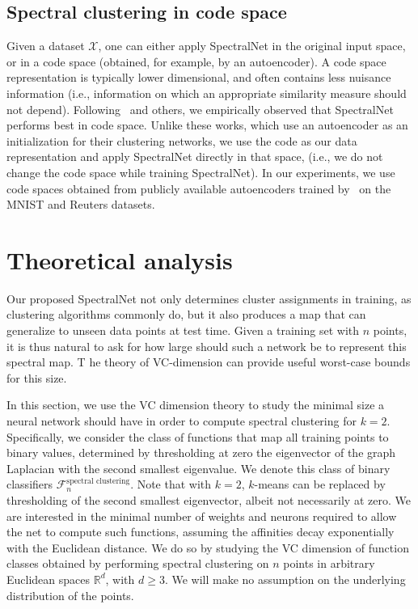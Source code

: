 \documentclass{article} %
\begin{document}
\subsection{Spectral clustering in code space}
Given a dataset $\mathcal{X}$, one can either apply SpectralNet in the original input space, or in a code space (obtained, for example, by an autoencoder). A code space representation is typically lower dimensional, and often contains less nuisance information (i.e., information on which an appropriate similarity measure should not depend).
Following~\citep{ yang2016towards, xie2016unsupervised, zheng2016variational} and others, we empirically observed that SpectralNet performs best in code space. Unlike these works, which use an autoencoder as an initialization for their clustering networks,  we use the code as our data representation and apply SpectralNet directly in that space, (i.e., we do not change the code space while training SpectralNet).
In our experiments, we use code spaces obtained from publicly available autoencoders trained by~\citet{zheng2016variational} on the MNIST and Reuters datasets.



\section {Theoretical analysis}\label{sec:analysis}
Our proposed SpectralNet not only determines cluster assignments in training, as clustering algorithms commonly do, but it also produces a map that can generalize to unseen data points at test time.
Given a training set with $n$ points, it is thus natural to ask for  how large should such a network be to represent this spectral map.
T he theory of VC-dimension can provide useful worst-case bounds for this size.

In this section, we use the VC dimension theory to study the minimal size a neural network should have in order to compute spectral clustering for $k=2$.
Specifically, we consider the class of functions that map all training points to binary values, determined by thresholding at zero the eigenvector of the graph Laplacian with the second smallest eigenvalue. We denote this class of binary classifiers $\mathcal{F}^\text{spectral clustering}_n$. Note that with $k=2$, $k$-means can be replaced by thresholding of the second smallest eigenvector, albeit not necessarily at zero. We are interested in the minimal number of weights and neurons required to allow the net to compute such functions, assuming the affinities decay exponentially with the Euclidean distance.
We do so by studying the VC dimension of function classes obtained by performing spectral clustering on $n$ points in arbitrary Euclidean spaces $\mathbb{R}^d$, with $d\ge 3$.
We will make no assumption on the underlying distribution of the points.
\end{document}
